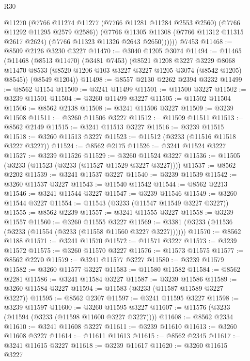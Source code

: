 \begin{lexlean}{R30}
\begin{coremodule}
            @11270
            (@7766
              @11274
              @11277
              (@7766 @11281 @11284 @2553 @2560)
              (@7766 @11292 @11295 @2579 @2586))
            (@7766
              @11305
              @11308
              (@7766 @11312 @11315 @2617 @2624)
              (@7766 @11323 @11326 @2643 @2650))))))
    @7453
@11468 := @8509 @2126 @3230 @3227
@11470 := @3040 @1205 @3074
@11494 := @11465
    (@11468
      (@8513 @11470)
      (@3481 @7453)
      (@8521
        @1208
        @3227
        @3229
        @8068
        @11470
        @8533
        (@8520 @1206 @103 @3227 @3227 @1205 @3074 (@8542 @1205) @8545))
      (@8549 @1204))
@11498 := @8557 @2130 @2262 @2394 @3232
@11499 := @8562 @1154
@11500 := @3241 @11499
@11501 := @11500 @3227
@11502 := @3239 @11501
@11504 := @3260 @11499 @3227
@11505 := @11502 @11504
@11506 := @8562 @2138
@11508 := @3241 @11506 @3227
@11509 := @3239 @11508
@11511 := @3260 @11506 @3227
@11512 := @11509 @11511
@11513 := @8562 @2149
@11515 := @3241 @11513 @3227
@11516 := @3239 @11515
@11518 := @3260 @11513 @3227
@11523 := @11512 (@3233 (@11516 @11518 @3227 @3227))
@11524 := @8562 @2175
@11526 := @3241 @11524 @3227
@11527 := @3239 @11526
@11529 := @3260 @11524 @3227
@11536 := @11505 (@3233 (@11523 (@3233 (@11527 @11529 @3227 @3227))))
@11537 := @8562 @2202
@11539 := @3241 @11537 @3227
@11540 := @3239 @11539
@11542 := @3260 @11537 @3227
@11543 := @11540 @11542
@11544 := @8562 @2213
@11546 := @3241 @11544 @3227
@11547 := @3239 @11546
@11549 := @3260 @11544 @3227
@11554 := @11543 (@3233 (@11547 @11549 @3227 @3227))
@11555 := @8562 @2239
@11557 := @3241 @11555 @3227
@11558 := @3239 @11557
@11560 := @3260 @11555 @3227
@11569 := @3381 (@3233 (@11536 (@3233 (@11554 (@3233 (@11558 @11560 @3227 @3227))))))
@11570 := @8562 @1188
@11571 := @3241 @11570
@11572 := @11571 @3227
@11573 := @3239 @11572
@11575 := @3260 @11570 @3227
@11576 := @11573 @11575
@11577 := @8562 @2270
@11579 := @3241 @11577 @3227
@11580 := @3239 @11579
@11582 := @3260 @11577 @3227
@11583 := @11580 @11582
@11584 := @8562 @2281
@11586 := @3241 @11584 @3227
@11587 := @3239 @11586
@11589 := @3260 @11584 @3227
@11594 := @11583 (@3233 (@11587 @11589 @3227 @3227))
@11595 := @8562 @2307
@11597 := @3241 @11595 @3227
@11598 := @3239 @11597
@11600 := @3260 @11595 @3227
@11607 := @11576 (@3233 (@11594 (@3233 (@11598 @11600 @3227 @3227))))
@11608 := @8562 @2334
@11610 := @3241 @11608 @3227
@11611 := @3239 @11610
@11613 := @3260 @11608 @3227
@11614 := @11611 @11613
@11615 := @8562 @2345
@11617 := @3241 @11615 @3227
@11618 := @3239 @11617
@11620 := @3260 @11615 @3227

\end{coremodule}
\end{lexlean}
